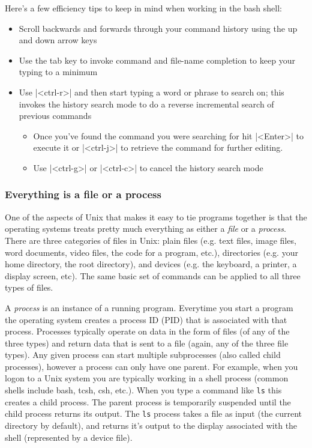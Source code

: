 Here's a few efficiency tips to keep in mind when working in the bash shell:
\begin{itemize}
    \item Scroll backwards and forwards through your command history using the up and down arrow keys
    \item Use the tab key to invoke command and file-name completion to keep your typing to a minimum
    \item Use |<ctrl-r>| and then start typing a word or phrase to search on; this invokes the history search mode to do a reverse incremental search of previous commands
    \begin{itemize}
        \item Once you've found the command you were searching for hit |<Enter>| to execute it or |<ctrl-j>| to retrieve the command for further editing.
        \item Use |<ctrl-g>| or |<ctrl-c>| to cancel the history search mode
    \end{itemize}
\end{itemize}



\subsubsection{Everything is a file or a process}

One of the aspects of Unix that makes it easy to tie programs together is that the operating systems treats pretty much everything as either a \emph{file} or a \emph{process}.  There are three categories of files in Unix: plain files (e.g. text files, image files, word documents, video files, the code for a program, etc.), directories (e.g. your home directory, the root directory), and devices (e.g. the keyboard, a printer, a display screen, etc). The same basic set of commands can be applied to all three types of files.

A \emph{process} is an instance of a running program.  Everytime you start a program the operating system creates a process ID (PID) that is associated with that process. Processes typically operate on data in the form of files (of any of the three types) and return data that is sent to a file (again, any of the three file types). Any given process can start multiple subprocesses (also called child processes), however a process can only have one parent. For example, when you logon to a Unix system you are typically working in a shell process (common shells include bash, tcsh, csh, etc.). When you type a command like \verb=ls= this creates a child process. The parent process is temporarily suspended until the child process returns its output. The \verb=ls= process takes a file as input (the current directory by default), and returns it's output to the display associated with the shell (represented by a device file).


